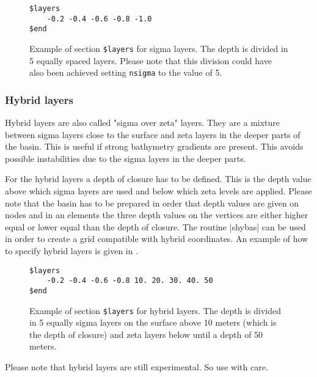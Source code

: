 \begin{figure}[ht]
\begin{verbatim}
$layers
	-0.2 -0.4 -0.6 -0.8 -1.0
$end
\end{verbatim}
\caption{Example of section {\tt \$layers} for sigma layers.
The depth is divided in 5 equally spaced layers. Please note that
this division could have also been achieved setting {\tt nsigma} to the
value of 5.}
\label{fig:slayers}
\end{figure}

\subsubsection{Hybrid layers}

Hybrid layers are also called "sigma over zeta" layers. They are a
mixture between sigma layers close to the surface and zeta layers in
the deeper parts of the basin. This is useful if strong bathymetry
gradients are present. This avoids possible instabilities due to the
sigma layers in the deeper parts.

For the hybrid layers a depth of closure has to be defined. This is the
depth value above which sigma layers are used and below which zeta levels
are applied. Please note that the basin has to be prepared in order that
depth values are given on nodes and in an elements the three depth values
on the vertices are either higher equal or lower equal than the depth
of closure. The routine |shybas| can be used in order to create
a grid compatible with hybrid coordinates. An example of how
to specify hybrid layers is given in
\Fig{}.

\begin{figure}[ht]
\begin{verbatim}
$layers
	-0.2 -0.4 -0.6 -0.8 10. 20. 30. 40. 50
$end
\end{verbatim}
\caption{Example of section {\tt \$layers} for hybrid layers.
The depth is divided in 5 equally sigma layers on the surface above 10 meters
(which is the depth of closure) and zeta layers below until a depth
of 50 meters.}
\label{fig:hlayers}
\end{figure}

Please note that hybrid layers are still experimental. So use with care.



